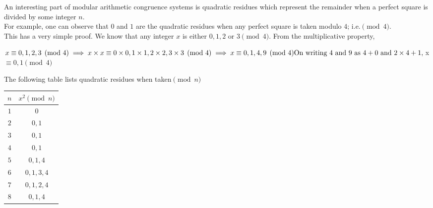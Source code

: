 \begin{mathbox}{}
{An interesting part of modular arithmetic congruence systems is quadratic residues which represent the remainder when a perfect square is divided by some integer $n$. \\
For example, one can observe that $0$ and $1$ are the quadratic residues when any perfect square is taken modulo $4$; i.e.$\pmod 4$.\\
This has a very simple proof. We know that any integer $x$ is either $0, 1, 2$ or $3 \pmod 4$. From the multiplicative property,
\begin{center}
    $x \equiv 0, 1, 2, 3 \pmod 4\\
    \implies x \times x \equiv 0 \times 0, 1 \times 1, 2 \times 2, 3 \times 3 \pmod 4\\
    \implies x \equiv 0, 1, 4, 9 \pmod 4\\
    \text{On writing $4$ and $9$ as $4 + 0$ and $2\times 4 + 1$},\\
    $x$ \equiv 0, 1 \pmod 4$
\end{center}
The following table lists quadratic residues when taken$\pmod n$}
\begin{center}
\begin{tabular}{ |c|c| } 
    \hline
    $n$ & $x^2 \pmod n$\\
    \hline
    $1$ & $0$\\
    $2$ & $0, 1$\\
    $3$ & $0, 1$\\
    $4$ & $0, 1$\\
    $5$ & $0, 1, 4$\\
    $6$ & $0, 1, 3, 4$\\
    $7$ & $0, 1, 2, 4$\\
    $8$ & $0, 1, 4$\\
    \hline
\end{tabular}
\end{center}
\end{mathbox}
